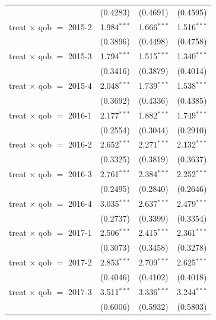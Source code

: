 \begin{table}[H]
\begin{tabular}{lccc}
                                     & (0.4283)      & (0.4691)       & (0.4595)\\   
      treat $\times$ qob $=$ 2015-2  & 1.984$^{***}$ & 1.666$^{***}$  & 1.516$^{***}$\\   
                                     & (0.3896)      & (0.4498)       & (0.4758)\\   
      treat $\times$ qob $=$ 2015-3  & 1.794$^{***}$ & 1.515$^{***}$  & 1.340$^{***}$\\   
                                     & (0.3416)      & (0.3879)       & (0.4014)\\   
      treat $\times$ qob $=$ 2015-4  & 2.048$^{***}$ & 1.739$^{***}$  & 1.538$^{***}$\\   
                                     & (0.3692)      & (0.4336)       & (0.4385)\\   
      treat $\times$ qob $=$ 2016-1  & 2.177$^{***}$ & 1.882$^{***}$  & 1.749$^{***}$\\   
                                     & (0.2554)      & (0.3044)       & (0.2910)\\   
      treat $\times$ qob $=$ 2016-2  & 2.652$^{***}$ & 2.271$^{***}$  & 2.132$^{***}$\\   
                                     & (0.3325)      & (0.3819)       & (0.3637)\\   
      treat $\times$ qob $=$ 2016-3  & 2.761$^{***}$ & 2.384$^{***}$  & 2.252$^{***}$\\   
                                     & (0.2495)      & (0.2840)       & (0.2646)\\   
      treat $\times$ qob $=$ 2016-4  & 3.035$^{***}$ & 2.637$^{***}$  & 2.479$^{***}$\\   
                                     & (0.2737)      & (0.3399)       & (0.3354)\\   
      treat $\times$ qob $=$ 2017-1  & 2.506$^{***}$ & 2.415$^{***}$  & 2.361$^{***}$\\   
                                     & (0.3073)      & (0.3458)       & (0.3278)\\   
      treat $\times$ qob $=$ 2017-2  & 2.853$^{***}$ & 2.709$^{***}$  & 2.625$^{***}$\\   
                                     & (0.4046)      & (0.4102)       & (0.4018)\\   
      treat $\times$ qob $=$ 2017-3  & 3.511$^{***}$ & 3.336$^{***}$  & 3.244$^{***}$\\   
                                     & (0.6006)      & (0.5932)       & (0.5803)\\   

\end{tabular}
\end{table}
